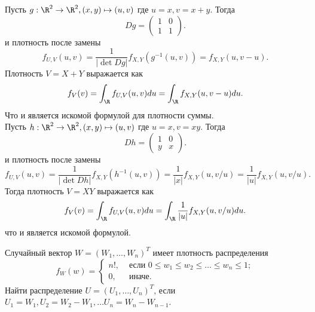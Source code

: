 \begin{solution}
    Пусть $g: \R^2 \to \R^2, (x, y) \mapsto (u, v)$ где $u = x, v = x + y$.
    Тогда
    \[
        Dg = \begin{pmatrix*} 1 & 0 \\ 1 & 1
        \end{pmatrix*}.
    \]
    и плотность после замены
    \[
        f_{U, V}(u, v) = \dfrac{1}{|\det Dg|}f_{X, Y}(g^{-1}(u, v)) = f_{X, Y}(u, v - u).
    \]
    Плотность $V = X + Y$ выражается как
    \[
        f_V(v) = \int_{\R} f_{U, V}(u, v)du = \int_\R f_{X, Y}(u, v - u)du.
    \]
    Что и является искомой формулой для плотности суммы. \\
    Пусть $h: \R^2 \to \R^2, (x, y) \mapsto (u, v)$ где $u = x, v = xy$.
    Тогда
    \[
        Dh = \begin{pmatrix*}
            1 & 0 \\ y & x
        \end{pmatrix*}.
    \]
    и плотность после замены
    \[
        f_{U, V}(u, v) = \dfrac{1}{|\det Dh|}f_{X, Y}(h^{-1}(u, v)) = \dfrac{1}{|x|}f_{X, Y}(u, v/u) = \dfrac{1}{|u|}f_{X, Y}(u, v/u).
    \]
    Тогда плотность $V = XY$ выражается как
    \[
        f_V(v) = \int_{\R} f_{U, V}(u, v)du = \int_{\R} \dfrac{1}{|u|}f_{X, Y}(u, v/u)du.
    \]
    что и является искомой формулой.
\end{solution}
\begin{problem}
    Случайный вектор $W = (W_1, \ldots, W_n)^T$ имеет плотность распределения
    \[
        f_W(w) = \begin{cases}
                     n!, & \text{ если } 0 \leq w_1 \leq w_2 \leq \ldots \leq w_n \leq 1; \\
                     0, & \text{ иначе.}
        \end{cases}
    \]
    Найти распределение $U = (U_1, \ldots, U_n)^T$, если $U_1 = W_1, U_2 = W_2 - W_1, \ldots U_n = W_n - W_{n - 1}$.
\end{problem}
